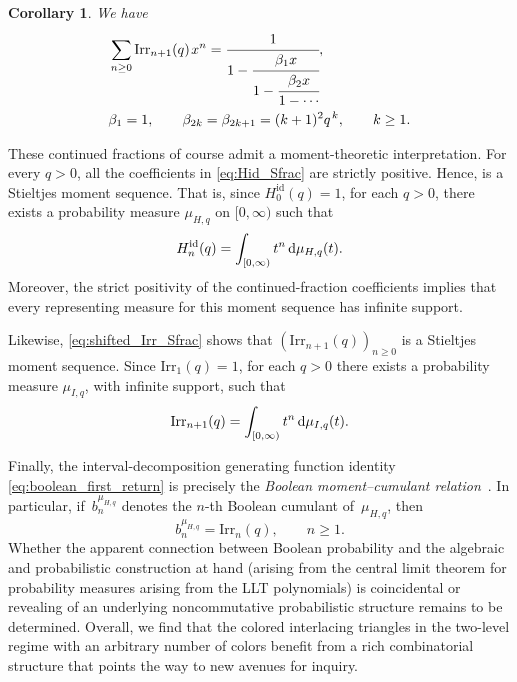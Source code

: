 \documentclass[10pt,a4paper]{amsart}
\numberwithin{equation}{section}
\newcommand{\ssp}{\hspace{1pt}}
\newtheorem{Corollary}[Theorem]{Corollary}
\theoremstyle{definition}
\begin{document}
\begin{Corollary}\label{cor:shifted_Irr_Sfrac}
We have
\begin{equation}
\begin{split}
 & \sum_{n\geq0}\mathrm{Irr}_{n+1}(q)\ssp x^n
  =
  \cfrac{1}{1-\cfrac{\beta_1x}
  {1-\cfrac{\beta_2x}
  {1-\cdots}}},
  \\
 & \beta_1=1, \qquad
  \beta_{2k}=\beta_{2k+1}
  =(k+1)^2q^{\ssp k},
  \qquad k\geq1.
\end{split}
  \label{eq:shifted_Irr_Sfrac}
\end{equation}
\end{Corollary}


These continued fractions of course admit a moment-theoretic interpretation. For every $q>0$, all the coefficients in
\eqref{eq:Hid_Sfrac} are strictly positive. Hence, 
is a Stieltjes moment sequence. That is, since $H_0^{\mathrm{id}}(q)=1$, for each $q>0$,
there exists a probability measure $\mu_{H,q}$ on $[0,\infty)$
such that
\[
  H_n^{\mathrm{id}}(q)
  =
  \int_{[0,\infty)}t^n\,{\rm d}\mu_{H,q}(t).
\]
Moreover, the strict positivity of the continued-fraction coefficients implies
that every representing measure for this moment sequence has infinite support.

Likewise, \eqref{eq:shifted_Irr_Sfrac} shows that $(\mathrm{Irr}_{n+1}(q))_{n\geq0}$
is a Stieltjes moment sequence. Since $\mathrm{Irr}_{1}(q)=1$, for each $q>0$ there exists a probability measure $\mu_{I,q}$, with infinite support, such that
 \begin{equation*}
  \mathrm{Irr}_{n+1}(q) =
  \int_{[0,\infty)}t^n\,{\rm d}\mu_{I,q}(t).%
\end{equation*}

Finally, the interval-decomposition generating function identity
\eqref{eq:boolean_first_return} is precisely the \emph{Boolean
moment--cumulant relation}~\cite{SpeicherWoroudi1997}. In particular,
if~$b_n^{\mu_{H,q}}$ denotes the $n$-th Boolean cumulant of~$\mu_{H,q}$, then
\[
  b_n^{\mu_{H,q}}=\mathrm{Irr}_n(q),
  \qquad n\geq1.
\]
Whether the apparent connection between Boolean probability and the algebraic and probabilistic construction at hand (arising from the central limit theorem for probability measures arising from the LLT polynomials) is coincidental or revealing of an underlying noncommutative probabilistic
structure remains to be determined.
Overall, we find that the colored inter\-lacing triangles in the two-level regime with an arbitrary number of
colors benefit from a rich combinatorial structure that points the
way to new avenues for inquiry.
\end{document}
